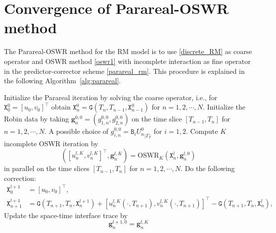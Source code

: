 \documentclass[11pt]{article}
\begin{document}
\section{Convergence of Parareal-OSWR method}\label{Section4}
The Parareal-OSWR method for the RM model is to use \eqref{discrete_RM} as coarse operator and OSWR method \eqref{oswr1} with incomplete interaction as fine operator in the predictor-corrector scheme \eqref{parareal_rm}. This procedure is explained in the following Algorithm~\ref{alg:parareal}.
\begin{algorithm}
\caption{Parareal - incomplete OSWR Method}
\label{alg:parareal}
\begin{algorithmic}[1]
    \State Initialize the Parareal iteration by solving the coarse operator, i.e., for $\mathtt{X}_{0}^0=[u_0, v_0]^{\top}$ obtain $\mathtt{X}_n^{0}=\mathtt{G}(T_{n}, T_{n-1}, \mathtt{X}_{n-1}^0)$ for $n=1,2,\cdots, N$.
    \State Initialize the Robin data by taking $\boldsymbol{g}_{n}^{0,0}=\left({g}_{1,n}^{0,0}, {g}_{2,n}^{0,0} \right)$ on the time slice $[T_{n-1}, T_n]$ for $n=1,2,\cdots, N$. A possible choice of ${g}_{i,n}^{0,0} = {\mathtt{B}_i {U}_n^{0}}_{|\Gamma_T}$ for $i=1, 2$. 
         \State Compute $K$ incomplete OSWR iteration by 
         \begin{equation}
         \left( [u_n^{l,K}, v_n^{l,K}]^{\top}, \boldsymbol{g}_n^{l,K} \right)= \text{OSWR}_{K} \left( \mathtt{X}_n^{l}, \boldsymbol{g}_n^{l,0} \right)
         \end{equation}
         in parallel on the time slices $[T_{n-1}, T_n]$ for $n=1,2,\cdots, N$.
        \State Do the following correction:
\begin{equation}\label{parareal_inc_oswr}
    \begin{aligned}
       \mathtt{X}_0^{l+1} & =[ u_0, v_0]^{\top},\\
      \mathtt{X}_{n+1}^{l+1} & =\mathtt{G}(T_{n+1}, T_n, \mathtt{X}_n^{l+1})+[u_n^{l,K}(\cdot, T_{n+1}), v_n^{l,K}(\cdot, T_{n+1})]^{\top}-\mathtt{G}(T_{n+1}, T_n, \mathtt{X}_n^l),
    \end{aligned}       
\end{equation}
        \State Update the space-time interface trace by \begin{equation}\label{parareal_inc_oswr2}
    \boldsymbol{g}_n^{l+1,0}= \boldsymbol{g}_n^{l,K}      
\end{equation}
    \EndFor
\end{algorithmic}
\end{algorithm}
\end{document}
